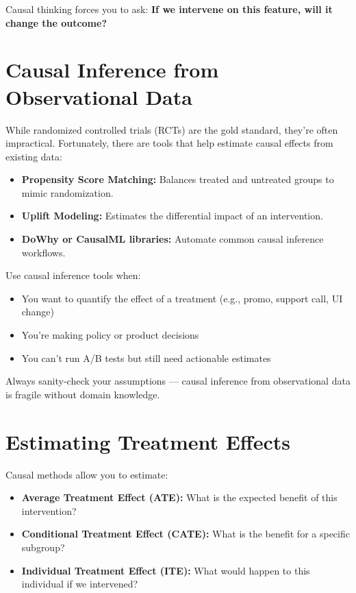 \documentclass[12pt,openany]{book}
\begin{document}
Causal thinking forces you to ask: \textbf{If we intervene on this feature, will it change the outcome?}

\section{Causal Inference from Observational Data}

While randomized controlled trials (RCTs) are the gold standard, they’re often impractical. Fortunately, there are tools that help estimate causal effects from existing data:
\begin{itemize}
  \item \textbf{Propensity Score Matching:} Balances treated and untreated groups to mimic randomization.
  \item \textbf{Uplift Modeling:} Estimates the differential impact of an intervention.
  \item \textbf{DoWhy or CausalML libraries:} Automate common causal inference workflows.
\end{itemize}

Use causal inference tools when:
\begin{itemize}
  \item You want to quantify the effect of a treatment (e.g., promo, support call, UI change)
  \item You’re making policy or product decisions
  \item You can’t run A/B tests but still need actionable estimates
\end{itemize}

\begin{notebox}
Always sanity-check your assumptions — causal inference from observational data is fragile without domain knowledge.
\end{notebox}

\section{Estimating Treatment Effects}

Causal methods allow you to estimate:
\begin{itemize}
  \item \textbf{Average Treatment Effect (ATE):} What is the expected benefit of this intervention?
  \item \textbf{Conditional Treatment Effect (CATE):} What is the benefit for a specific subgroup?
  \item \textbf{Individual Treatment Effect (ITE):} What would happen to this individual if we intervened?
\end{itemize}
\end{document}
